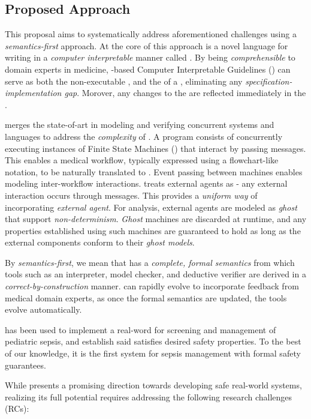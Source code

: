 \subsection{Proposed Approach}

This proposal aims to systematically address aforementioned challenges
using a \emph{semantics-first} approach. At the core of this approach
is a novel language for writing \BPGs{} in a \emph{computer interpretable}
manner called \MediK{}. By being \emph{comprehensible} to domain experts in medicine, \MediK{}-based
Computer Interpretable Guidelines (\CIGs{}) can serve as both the
non-executable \BPG{}, and the \BPGLogic{} of a \CDSS{}, eliminating any
\emph{specification-implementation gap}. Morover, any changes to the
\CIG{} are reflected immediately in the \CDSS{}.

\MediK{} merges the state-of-art in modeling and verifying concurrent systems and
\CIG{} languages to address the \emph{complexity} of \CDSSs{}.
A \MediK{} program consists of concurrently executing instances of
Finite State Machines (\FSMs{}) that interact by passing messages.
This enables a medical workflow, typically expressed using a flowchart-like
notation, to be naturally translated to \FSM{}. Event passing between machines
enables modeling inter-workflow interactions. \MediK{} treats
external agents as \FSMs{} - any external interaction occurs
through messages. This provides a \emph{uniform way} of incorporating
\emph{external agent}. For analysis, external agents are modeled as \emph{ghost}
\FSMs{} that support \emph{non-determinism}. \emph{Ghost} machines are discarded
at runtime, and any properties established using such machines are guaranteed
to hold as long as the external components conform to their \emph{ghost models}.

By \emph{semantics-first}, we mean that \MediK{}
has a \emph{complete, formal semantics}  from which tools such as an interpreter, model checker,
and deductive verifier are derived in a \emph{correct-by-construction}
manner. \MediK{} can rapidly evolve to incorporate feedback from
medical domain experts, as once the formal semantics are updated, the
tools evolve automatically.

\MediK{} has been used to implement a real-word \CDSS{} for screening and
management of pediatric sepsis, and establish said \CDSS{} satisfies desired
safety properties. To the best of our knowledge, it is the first system
for sepsis management with formal safety guarantees.

While \MediK{} presents a promising direction towards developing safe real-world
systems, realizing its full potential requires addressing the following research
challenges (RCs):

